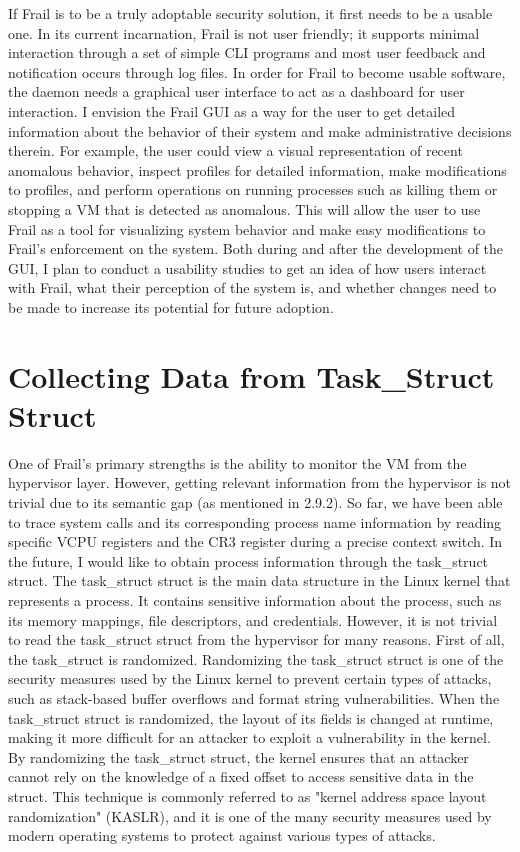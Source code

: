 \documentclass{report}
\begin{document}
\begin{spacing}{1.5}
{\large
If Frail is to be a truly adoptable security solution, it first needs to be a usable one. In its current incarnation, Frail is not user friendly; it supports minimal interaction through a set of simple CLI programs and most user feedback and notification occurs through log files. In order for Frail to become usable software, the daemon needs a graphical user interface to act as a dashboard for user interaction. I envision the Frail GUI as a way for the user to get detailed information about the behavior of their system and make administrative decisions therein. For example, the user could view a visual representation of recent anomalous behavior, inspect profiles for detailed information, make modifications to profiles, and perform operations on running processes such as killing
them or stopping a VM that is detected as anomalous. This will allow the user to use Frail as a tool for visualizing system behavior and make easy modifications to Frail's enforcement on the system. Both during and after the development of the GUI, I plan to conduct a usability studies to get an idea of how users interact with Frail, what their perception of the system is, and whether changes need to be made to increase its potential for future adoption.
\newline
}




\section{Collecting Data from Task\_Struct Struct}


{\large
One of Frail's primary strengths is the ability to monitor the VM from the hypervisor layer. However, getting relevant information from the hypervisor is not trivial due to its semantic gap (as mentioned in 2.9.2). So far, we have been able to trace system calls and its corresponding process name information by reading specific VCPU registers and the CR3 register during a precise context switch. In the future, I would like to obtain process information through the task\_struct struct. The task\_struct struct is the main data structure in the Linux kernel that represents a process. It contains sensitive information about the process, such as its memory mappings, file descriptors, and credentials. However, it is not trivial to read the task\_struct struct from the hypervisor for many reasons. First of all, the task\_struct is randomized. Randomizing the task\_struct struct is one of the security measures used by the Linux kernel to prevent certain types of attacks, such as stack-based buffer overflows and format string vulnerabilities. When the task\_struct struct is randomized, the layout of its fields is changed at runtime, making it more difficult for an attacker to exploit a vulnerability in the kernel. By randomizing the task\_struct struct, the kernel ensures that an attacker cannot rely on the knowledge of a fixed offset to access sensitive data in the struct. This technique is commonly referred to as "kernel address space layout randomization" (KASLR), and it is one of the many security measures used by modern operating systems to protect against various types of attacks.
\newline
}



\end{spacing}
\end{document}
